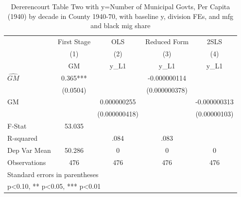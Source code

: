\begin{table}[htbp]\centering
\def\sym#1{\ifmmode^{#1}\else\(^{#1}\)\fi}
\caption{Dererencourt Table Two with y=Number of Municipal Govts, Per Capita (1940) by decade in County 1940-70, with baseline y, division FEs, and mfg and black mig share}
\begin{tabular}{l*{4}{c}}
\toprule
                    & First Stage   &         OLS   &Reduced Form   &        2SLS   \\
                    &\multicolumn{1}{c}{(1)}&\multicolumn{1}{c}{(2)}&\multicolumn{1}{c}{(3)}&\multicolumn{1}{c}{(4)}\\
                    &\multicolumn{1}{c}{GM}&\multicolumn{1}{c}{y\_L1}&\multicolumn{1}{c}{y\_L1}&\multicolumn{1}{c}{y\_L1}\\
\midrule
$\hat{GM}$          &       0.365***&               &-0.000000114   &               \\
                    &    (0.0504)   &               &(0.000000378)   &               \\
\addlinespace
GM                  &               & 0.000000255   &               &-0.000000313   \\
                    &               &(0.000000418)   &               &(0.00000103)   \\
\midrule
F-Stat              &      53.035   &               &               &               \\
R-squared           &               &        .084   &        .083   &               \\
Dep Var Mean        &      50.286   &           0   &           0   &           0   \\
Observations        &         476   &         476   &         476   &         476   \\
\bottomrule
\multicolumn{5}{l}{\footnotesize Standard errors in parentheses}\\
\multicolumn{5}{l}{\footnotesize * p<0.10, ** p<0.05, *** p<0.01}\\
\end{tabular}
\end{table}

